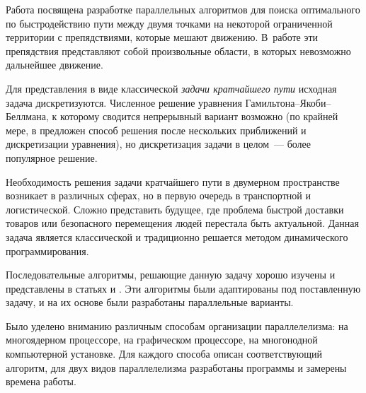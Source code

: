 Работа посвящена разработке параллельных алгоритмов для поиска оптимального по быстродействию пути между двумя точками на некоторой ограниченной территории с препядствиями, которые мешают движению.
В~работе эти препядствия представляют собой произвольные области, в которых невозможно дальнейшее движение.

Для представления в виде классической \textit{задачи кратчайшего пути} исходная задача дискретизуются.
Численное решение уравнения Гамильтона--Якоби--Беллмана, к которому сводится непрерывный вариант возможно
 (по крайней мере, в \cite{gyb} предложен способ решения после нескольких приближений и дискретизации уравнения), но дискретизация задачи в целом~--- более популярное решение. 

Необходимость решения задачи кратчайшего пути в двумерном пространстве возникает в различных сферах, но в первую очередь в транспортной и логистической.
Сложно представить будущее, где проблема быстрой доставки товаров или безопасного перемещения людей перестала быть актуальной.
Данная задача является классической и традиционно решается методом динамического программирования\cite{bellman}.

Последовательные алгоритмы, решающие данную задачу хорошо изучены и представлены в статьях \cite{dijkstra} и \cite{review}.
Эти алгоритмы были адаптированы под поставленную задачу, и на их основе были разработаны параллельные варианты.

Было уделено вниманию различным способам организации параллелелизма: на многоядерном процессоре, на графическом процессоре, на многонодной компьютерной установке.
Для каждого способа описан соответствующий алгоритм, для двух видов параллелелизма разработаны программы и замерены времена работы.